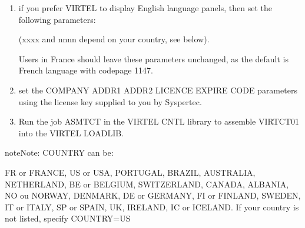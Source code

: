 \documentclass[letterpaper,10pt,english]{sphinxmanual}
\begin{document}
\begin{enumerate}
\begin{enumerate}
\item {} 
if you prefer VIRTEL to display English language panels, then set
the following parameters:

\begin{sphinxVerbatim}[commandchars=\\\{\}]
                                               
                                           
                                        
\end{sphinxVerbatim}

(xxxx and nnnn depend on your country, see below).

Users in France should leave these parameters unchanged, as the
default is French language with codepage 1147.

\item {} 
set the COMPANY ADDR1 ADDR2 LICENCE EXPIRE CODE parameters using
the license key supplied to you by Syspertec.

\item {} 
Run the job ASMTCT in the VIRTEL CNTL library to assemble VIRTCT01
into the VIRTEL LOADLIB.

\end{enumerate}

\end{enumerate}

\begin{sphinxadmonition}{note}{Note:}
COUNTRY can be:

FR or FRANCE, US or USA, PORTUGAL, BRAZIL, AUSTRALIA,
NETHERLAND, BE or BELGIUM, SWITZERLAND, CANADA, ALBANIA,
NO ou NORWAY, DENMARK, DE or GERMANY, FI or FINLAND,
SWEDEN, IT or ITALY, SP or SPAIN, UK, IRELAND, IC or ICELAND.
If your country is not listed, specify COUNTRY=US
\end{sphinxadmonition}
\end{document}
